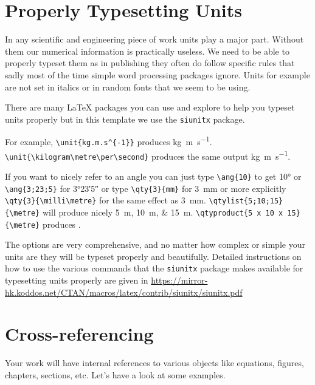\documentclass[11pt,twoside,openright]{report}
\begin{document}
\section{Properly Typesetting Units}

In any scientific and engineering piece of work units play a major part. Without them our numerical information is practically useless. We need to be able to properly typeset them as in publishing they often do follow specific rules that sadly most of the time simple word processing packages ignore. Units for example are not set in italics or in random fonts that we seem to be using.

There are many \LaTeX{} packages you can use and explore to help you typeset units properly but in this template we use the \verb|siunitx| package. 

For example, \verb|\unit{kg.m.s^{-1}}| produces \unit{kg.m.s^{-1}}.  \verb|\unit{\kilogram\metre\per\second}| produces the same output \unit{\kilogram\metre\per\second}.

If you want to nicely refer to an angle you can just type \verb|\ang{10}| to get \ang{10} or \verb|\ang{3;23;5}| for \ang{3;23;5} or type \verb|\qty{3}{mm}| for \qty{3}{mm} or more explicitly \verb|\qty{3}{\milli\metre}| for the same effect as \qty{3}{\milli\metre}. 
\verb|\qtylist{5;10;15}{\metre}| will produce nicely \qtylist{5;10;15}{\metre}. 
\verb|\qtyproduct{5 x 10 x 15}{\metre}| produces .


The options are very comprehensive, and no matter how complex or simple your units are they will be typeset properly and beautifully.
Detailed instructions on how to use the various commands that the \verb|siunitx| package makes available for typesetting units properly are given in \url{https://mirror-hk.koddos.net/CTAN/macros/latex/contrib/siunitx/siunitx.pdf}



\section{Cross-referencing}
\label{sec:crossreferencing}

Your work will have internal references to various objects like equations, figures, chapters, sections, etc. Let's have a look at some examples.

%
%
\end{document}
